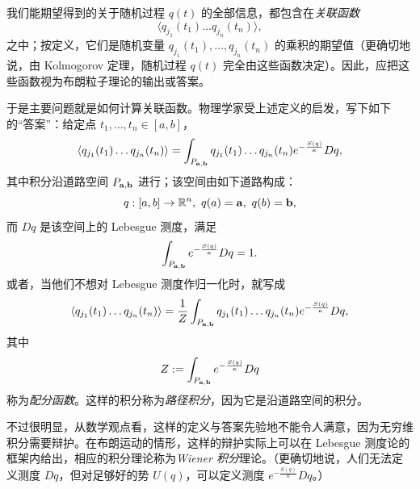 
我们能期望得到的关于随机过程 $q(t)$ 的全部信息，都包含在\emph{关联函数}
$$
\langle q_{j_1}(t_1) \ldots q_{j_n}(t_n)\rangle,
$$
之中；按定义，它们是随机变量 $q_{j_1}(t_1), \ldots, q_{j_n}(t_n)$ 的乘积的期望值（更确切地说，由 Kolmogorov 定理，随机过程 $q(t)$ 完全由这些函数决定）。因此，应把这些函数视为布朗粒子理论的输出或答案。

于是主要问题就是如何计算关联函数。物理学家受上述定义的启发，写下如下的“答案”：给定点 $t_1, \ldots ,t_n\in [a,b]$，
\begin{equation}\label{brmo}
\langle q_{j_1}(t_1) \ldots q_{j_n}(t_n)\rangle=
\int_{P_{\bold a,\bold b}} q_{j_1}(t_1) \ldots q_{j_n}(t_n)e^{-\frac{S(q)}{\kappa}}Dq, 
\end{equation}
其中积分沿道路空间 $P_{\bold a,\bold b}$ 进行；该空间由如下道路构成：
$$
q: [a,b]\to \Bbb R^n,\ q(a)=\bold a,\ q(b)=\bold b,
$$
而 $Dq$ 是该空间上的 Lebesgue 测度，满足
$$
\int_{P_{\bold a,\bold b}} e^{-\frac{S(q)}{\kappa}}Dq=1.
$$
或者，当他们不想对 Lebesgue 测度作归一化时，就写成
\begin{equation}\label{brmo1}
\langle q_{j_1}(t_1) \ldots q_{j_n}(t_n)\rangle=
\frac{1}{Z}\int_{P_{\bold a,\bold b}} q_{j_1}(t_1) \ldots q_{j_n}(t_n)e^{-\frac{S(q)}{\kappa}}Dq, 
\end{equation}
其中
$$
Z:=\int_{P_{\bold a,\bold b}} e^{-\frac{S(q)}{\kappa}}Dq
$$
称为\emph{配分函数}。这样的积分称为\emph{路径积分}，因为它是沿道路空间的积分。

不过很明显，从数学观点看，这样的定义与答案先验地不能令人满意，因为无穷维积分需要辩护。在布朗运动的情形，这样的辩护实际上可以在 Lebesgue 测度论的框架内给出，相应的积分理论称为\emph{Wiener 积分}理论。（更确切地说，人们无法定义测度 $Dq$，但对足够好的势 $U(q)$，可以定义测度 $e^{-\frac{S(q)}{\kappa}}Dq$。）


